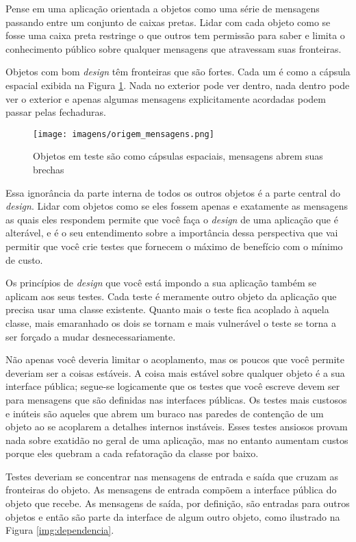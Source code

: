 Pense em uma aplicação orientada a objetos como uma série de mensagens passando entre um conjunto de caixas pretas. Lidar com cada objeto como se fosse uma caixa preta restringe o que outros tem permissão para saber e limita o conhecimento público sobre qualquer mensagens que atravessam suas fronteiras.

Objetos com bom \textit{design} têm fronteiras que são fortes. Cada um é como a cápsula espacial exibida na Figura \ref{img:origem_mensagens}. Nada no exterior pode ver dentro, nada dentro pode ver o exterior e apenas algumas mensagens explicitamente acordadas podem passar pelas fechaduras.

\begin{figure}[!htbp]
  \center
  \texttt{[image: imagens/origem\_mensagens.png]}
  \caption{Objetos em teste são como cápsulas espaciais, mensagens abrem suas brechas}
  \label{img:origem_mensagens}
\end{figure}

Essa ignorância da parte interna de todos os outros objetos é a parte central do \textit{design}. Lidar com objetos como se eles fossem apenas e exatamente as mensagens as quais eles respondem permite que você faça o \textit{design} de uma aplicação que é alterável, e é o seu entendimento sobre a importância dessa perspectiva que vai permitir que você crie testes que fornecem o máximo de benefício com o mínimo de custo.

Os princípios de \textit{design} que você está impondo a sua aplicação também se aplicam aos seus testes. Cada teste é meramente outro objeto da aplicação que precisa usar uma classe existente. Quanto mais o teste fica acoplado à aquela classe, mais emaranhado os dois se tornam e mais vulnerável o teste se torna a ser forçado a mudar desnecessariamente.

Não apenas você deveria limitar o acoplamento, mas os poucos que você permite deveriam ser a coisas estáveis. A coisa mais estável sobre qualquer objeto é a sua interface pública; segue-se logicamente que os testes que você escreve devem ser para mensagens que são definidas nas interfaces públicas. Os testes mais custosos e inúteis são aqueles que abrem um buraco nas paredes de contenção de um objeto ao se acoplarem a detalhes internos instáveis. Esses testes ansiosos provam nada sobre exatidão no geral de uma aplicação, mas no entanto aumentam custos porque eles quebram a cada refatoração da classe por baixo.

Testes deveriam se concentrar nas mensagens de entrada e saída que cruzam as fronteiras do objeto. As mensagens de entrada compõem a interface pública do objeto que recebe. As mensagens de saída, por definição, são entradas para outros objetos e então são parte da interface de algum outro objeto, como ilustrado na Figura \ref{img:dependencia}.

